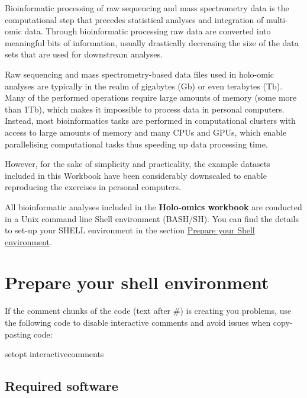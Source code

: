\documentclass[
]{book}
\newenvironment{Shaded}{\begin{snugshade}}{\end{snugshade}}
\newcommand{\ExtensionTok}[1]{#1}
\newcommand{\NormalTok}[1]{#1}
\begin{document}
Bioinformatic processing of raw sequencing and mass spectrometry data is the computational step that precedes statistical analyses and integration of multi-omic data. Through bioinformatic processing raw data are converted into meaningful bits of information, usually drastically decreasing the size of the data sets that are used for downstream analyses.

Raw sequencing and mass spectrometry-based data files used in holo-omic analyses are typically in the realm of gigabytes (Gb) or even terabytes (Tb). Many of the performed operations require large amounts of memory (some more than 1Tb), which makes it impossible to process data in personal computers. Instead, most bioinformatics tasks are performed in computational clusters with access to large amounts of memory and many CPUs and GPUs, which enable parallelising computational tasks thus speeding up data processing time.

However, for the sake of simplicity and practicality, the example datasets included in this Workbook have been considerably downscaled to enable reproducing the exercises in personal computers.

All bioinformatic analyses included in the \textbf{Holo-omics workbook} are conducted in a Unix command line Shell environment (BASH/SH). You can find the details to set-up your SHELL environment in the section \protect\hyperlink{prepare-shell}{Prepare your Shell environment}.

\hypertarget{prepare-shell}{%
\section{Prepare your shell environment}\label{prepare-shell}}

If the comment chunks of the code (text after \#) is creating you problems, use the following code to disable interactive comments and avoid issues when copy-pasting code:

\small

\begin{Shaded}
\begin{Highlighting}[]
\ExtensionTok{setopt}\NormalTok{ interactivecomments}
\end{Highlighting}
\end{Shaded}

\normalsize

\hypertarget{required-software}{%
\subsection*{Required software}\label{required-software}}
\end{document}

